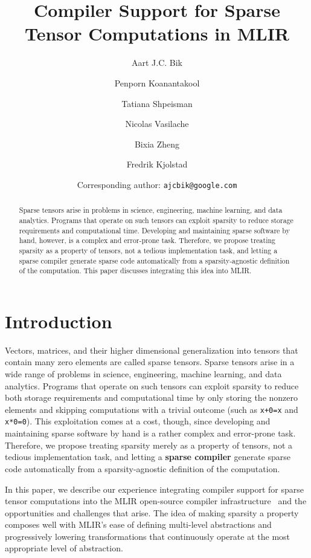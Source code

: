 \documentclass[10pt]{article}
\begin{document}
\title{Compiler Support for Sparse Tensor Computations in MLIR}
\author[1]{Aart J.C. Bik}
\author[1]{Penporn Koanantakool}
\author[1]{Tatiana Shpeisman}
\author[1]{Nicolas Vasilache}
\author[1]{Bixia Zheng}
\author[2]{Fredrik Kjolstad}
\date{Corresponding author: \texttt{ajcbik@google.com}}


\maketitle

\begin{abstract}
Sparse tensors arise in problems in science, engineering, machine learning, and data analytics. Programs that operate on such tensors can exploit sparsity to reduce storage requirements and computational time. Developing and maintaining sparse software by hand, however, is a complex and error-prone task. Therefore, we propose treating sparsity as a property of tensors, not a tedious implementation task, and letting a sparse compiler generate sparse code automatically from a sparsity-agnostic definition of the computation. This paper discusses integrating this idea into MLIR.
\end{abstract}

\section{Introduction}

Vectors, matrices, and their higher dimensional generalization into tensors that contain many zero elements are called sparse tensors. Sparse tensors arise in a wide range of problems in science, engineering, machine learning, and data analytics. Programs that operate on such tensors can exploit sparsity to reduce both storage requirements and computational time by only storing the nonzero elements and skipping computations with a trivial outcome (such as \verb|x+0=x| and \verb|x*0=0|). This exploitation comes at a cost, though, since developing and maintaining sparse software by hand is a rather complex and error-prone task. Therefore, we propose treating sparsity merely as a property of tensors, not a tedious implementation task, and letting a \textbf{sparse compiler} generate sparse code automatically from a sparsity-agnostic definition of the computation.

In this paper, we describe our experience integrating compiler support for sparse tensor computations into the MLIR open-source compiler infrastructure~\cite{mlir2020} and the opportunities and challenges that arise. The idea of making sparsity a property composes well with MLIR's ease of defining multi-level abstractions and progressively lowering transformations that continuously operate at the most appropriate level of abstraction.
\end{document}
